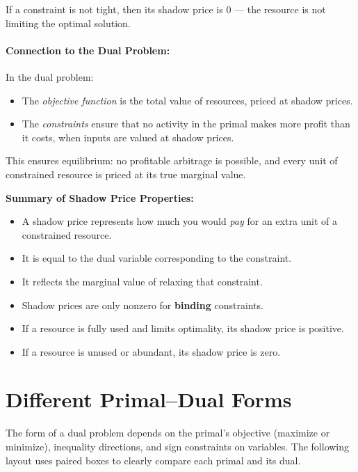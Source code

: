 If a constraint is not tight, then its shadow price is 0 — the resource is not limiting the optimal solution.

\vspace{1em}
\paragraph{Connection to the Dual Problem:}
In the dual problem:
\begin{itemize}
\item The \emph{objective function} is the total value of resources, priced at shadow prices.
\item The \emph{constraints} ensure that no activity in the primal makes more profit than it costs, when inputs are valued at shadow prices.
\end{itemize}
This ensures equilibrium: no profitable arbitrage is possible, and every unit of constrained resource is priced at its true marginal value.

\vspace{1em}
\noindent\textbf{Summary of Shadow Price Properties:}
\begin{itemize}
\item A shadow price represents how much you would \emph{pay} for an extra unit of a constrained resource.
\item It is equal to the dual variable corresponding to the constraint.
\item It reflects the marginal value of relaxing that constraint.
\item Shadow prices are only nonzero for \textbf{binding} constraints.
\end{itemize}

\vspace{0.5em}

\begin{itemize}
\item If a resource is fully used and limits optimality, its shadow price is positive.
\item If a resource is unused or abundant, its shadow price is zero.
\end{itemize}




\section{Different Primal–Dual Forms}

The form of a dual problem depends on the primal's objective (maximize or minimize), inequality directions, and sign constraints on variables. The following layout uses paired boxes to clearly compare each primal and its dual.

